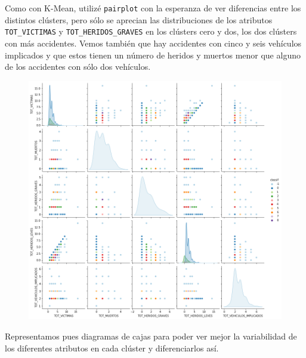 \documentclass[a4]{article}
\begin{document}
Como con K-Mean, utilizé \texttt{pairplot} con la esperanza de ver diferencias entre los distintos clústers, pero sólo se aprecian las distribuciones de los atributos \texttt{TOT\_VICTIMAS} y \texttt{TOT\_HERIDOS\_GRAVES} en los clústers cero y dos, los dos clústers con más accidentes. Vemos también que hay accidentes con cinco y seis vehículos implicados y que estos tienen un número de heridos y muertos menor que alguno de los accidentes con sólo dos vehículos.

\begin{figure}[H]
  \centering
  \includegraphics[width=153mm]{imagenes/c1_dbscan_pairplot}
\end{figure}

Representamos pues diagramas de cajas para poder ver mejor la variabilidad de los diferentes atributos en cada clúster y diferenciarlos así.
\end{document}
